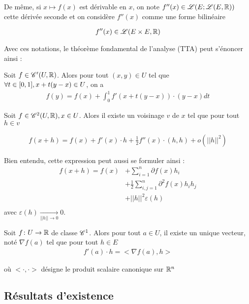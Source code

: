 \documentclass[french,a4paper,10pt]{article}
\begin{document}
	De même, si $x\mapsto f(x)$ est dérivable en $x$, on note $f''(x)\in\mathscr{L}(E;\mathscr{L}(E, \mathbb{R}))$ cette dérivée seconde et on considère $f''(x)$ comme une forme bilinéaire 
	
		\[\begin{aligned}
			f''(x)\in\mathscr{L}(E\times E,\mathbb{R})
		\end{aligned}\]
	
	Avec ces notations, le théorème fondamental de l'analyse (TTA) peut s'énoncer ainsi :
	
	\begin{theorem}
		Soit $f\in\mathscr{C}'(U, \mathbb{R})$. Alors pour tout $(x, y)\in U$ tel que $\forall t\in\mathopen{[}0, 1\mathclose{]}, x+t(y-x)\in U$, on a
			\[\begin{aligned}
				f(y)=f(x) + \int_0^1f'(x+t(y-x))\cdot(y-x)dt
			\end{aligned}\]	
	\end{theorem}

	
	Soit $f\in \mathscr{C}^2(U, \mathbb{R}), x\in U$. Alors il existe un voisinage $v$ de $x$ tel que pour tout $h\in v$
	
		\[\begin{aligned}
			f(x+h)=f(x)+f'(x)\cdot h+\frac12 f''(x)\cdot(h,h)+ o(||h||^2)
		\end{aligned}\]
	
	Bien entendu, cette expression peut aussi se formuler ainsi :
		\[\begin{aligned}
			f(x+h)=f(x)&+\sum_{i=1}^n\partial f(x)h_i\\&+\frac12\sum_{i,j=1}^n\partial^2f(x)h_ih_j\\&+||h||^2\varepsilon (h)\\
		\end{aligned}\]
	avec $\varepsilon(h)\underset{||h||\to 0}\to 0$.
	
	
	Soit $f\colon U\to \mathbb{R}$ de classe $\mathscr{C}^1$. Alors pour tout $a\in U$, il existe un unique vecteur, noté $\nabla f(a)$ tel que pour tout $h\in E$
		\[\begin{aligned}
			f'(a)\cdot h=<\nabla f(a), h>
		\end{aligned}\]
	
	où $<\cdot, \cdot>$ désigne le produit scalaire canonique sur $\mathbb{R}^n$
	
	\subsection{Résultats d'existence}
	
\end{document}
